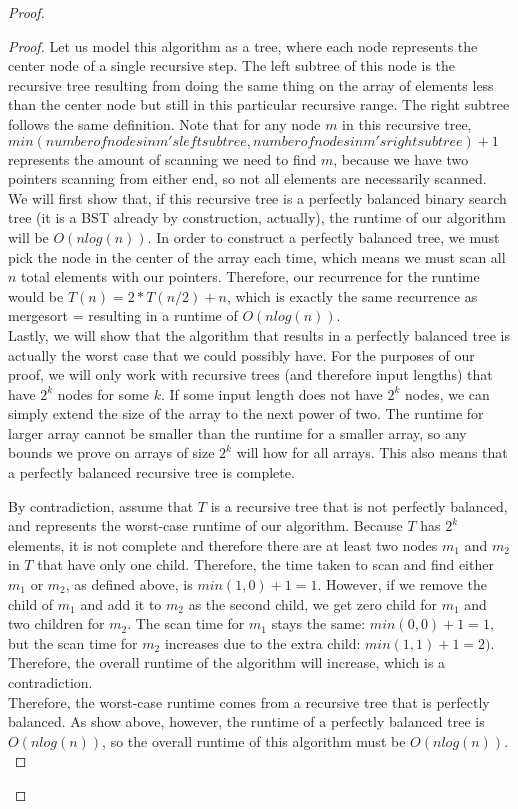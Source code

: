 \documentclass{article}
\theoremstyle{casestyle}
\begin{document}
\begin{proof}
  \begin{proof}
    Let us model this algorithm as a tree, where each node represents the center node of a single recursive step. The left subtree of this node is the recursive tree resulting from doing the same thing on the array of elements less than the center node but still in this particular recursive range. The right subtree follows the same definition. Note that for any node $m$ in this recursive tree, $min(number of nodes in m's left subtree, number of nodes in m's right subtree) + 1$ represents the amount of scanning we need to find $m$, because we have two pointers scanning from either end, so not all elements are necessarily scanned. \\

    We will first show that, if this recursive tree is a perfectly balanced binary search tree (it is a BST already by construction, actually), the runtime of our algorithm will be $O(nlog(n))$. In order to construct a perfectly balanced tree, we must pick the node in the center of the array each time, which means we must scan all $n$ total elements with our pointers. Therefore, our recurrence for the runtime would be $T(n) = 2 * T(n/2) + n$, which is exactly the same recurrence as mergesort = resulting in a runtime of $O(nlog(n))$. \\

    Lastly, we will show that the algorithm that results in a perfectly balanced tree is actually the worst case that we could possibly have. For the purposes of our proof, we will only work with recursive trees (and therefore input lengths) that have $2^k$ nodes for some $k$. If some input length does not have $2^k$ nodes, we can simply extend the size of the array to the next power of two. The runtime for larger array cannot be smaller than the runtime for a smaller array, so any bounds we prove on arrays of size $2^k$ will how for all arrays. This also means that a perfectly balanced recursive tree is complete.

    By contradiction, assume that $T$ is a recursive tree that is not perfectly balanced, and represents the worst-case runtime of our algorithm. Because $T$ has $2^k$ elements, it is not complete and therefore there are at least two nodes $m_1$ and $m_2$ in $T$ that have only one child. Therefore, the time taken to scan and find either $m_1$ or $m_2$, as defined above, is $min(1, 0) + 1 = 1$. However, if we remove the child of $m_1$ and add it to $m_2$ as the second child, we get zero child for $m_1$ and two children for $m_2$. The scan time for $m_1$ stays the same: $min(0, 0) + 1 = 1$, but the scan time for $m_2$ increases due to the extra child: $min(1, 1) + 1 = 2)$. Therefore, the overall runtime of the algorithm will increase, which is a contradiction.\\

    Therefore, the worst-case runtime comes from a recursive tree that is perfectly balanced. As show above, however, the runtime of a perfectly balanced tree is $O(nlog(n))$, so the overall runtime of this algorithm must be $O(nlog(n))$.\\
  \end{proof}

\end{proof}
\end{document}
